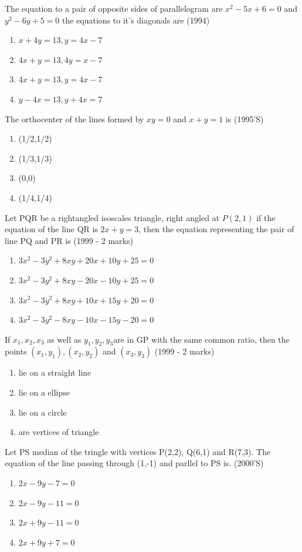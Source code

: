\documentclass[12pt]{article}
\begin{document}
\item The equation to a pair of  opposite sides of parallelogram are $x^2-5x+6=0$ and $y^2-6y+5=0$ the equations to it's diagonals are (1994)
\begin{enumerate}
\item $x+4y=13, y=4x-7$  
\item $4x+y=13, 4y=x-7$ 
\item $4x+y=13, y=4x-7$
\item $y-4x=13,y+4x=7$ 
\end{enumerate}
\item The orthocenter of the lines formed by $xy=0$ and $x+y=1$ is (1995'S)
\begin{enumerate}
\item (1/2,1/2) 
\item (1/3,1/3) 
\item (0,0)
\item (1/4,1/4)
\end{enumerate}
\item Let PQR be a rightangled isoscales triangle, right angled at $P(2,1)$ if the equation of the line QR is $2x+y=3$, then the equation representing the pair of line PQ and PR is (1999 - 2 marks)\\
\begin{enumerate}
\item $3x^2-3y^2+8xy+20x+10y+25=0$
\item $3x^2-3y^2+8xy-20x-10y+25=0$
\item $3x^2-3y^2+8xy+10x+15y+20=0$
\item $3x^2-3y^2-8xy-10x-15y-20=0$
\end{enumerate}
\item If $x_1,x_2,x_3$ as well as $y_1,y_2,y_3 $are in GP with the same common ratio, then the points $(x_1,y_1),(x_2,y_2)$ and $(x_3,y_3)$ (1999 - 2 marks)\\
\begin{enumerate}
\item lie on a straight line 
\item lie on a ellipse 
\item lie on a circle  
\item are vertices of triangle 
\end{enumerate}
\item Let PS median of the tringle with vertices P(2,2), Q(6,1) and R(7,3). The equation of the line passing through (1,-1) and parllel to PS is. (2000'S)
\begin{enumerate}
\item $2x-9y-7=0$ 
\item $2x-9y-11=0$ 
\item $2x+9y-11=0$
\item $2x+9y+7=0$
\end{enumerate}
\end{document}
